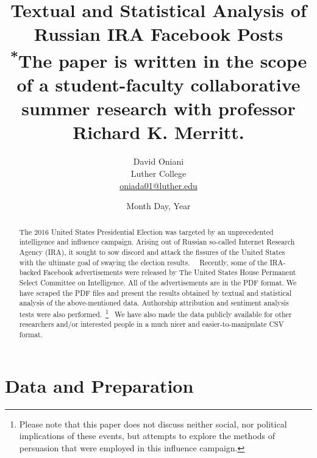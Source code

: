 \documentclass[12pt]{article}
\author{David Oniani\\
        Luther College\\
        \href{mailto:oniada01@luther.edu}{oniada01@luther.edu}}
\title{\textbf{Textual and Statistical Analysis of Russian IRA Facebook Posts}\\
      \small \textsuperscript{*}The paper is written in the scope of a student-faculty collaborative\\
                                summer research with professor Richard K. Merritt.}
\date{Month Day, Year}
\theoremstyle{definition}
\begin{document}
\maketitle


\begin{abstract}

\noindent The 2016 United States Presidential Election was targeted by an
unprecedented intelligence and influence campaign. Arising out of Russian
so-called Internet Research Agency (IRA), it sought to sow discord and attack
the fissures of the United States with the ultimate goal of swaying the
election results.~\cite{ira2016}~\cite{ira2016data} Recently, some of the
IRA-backed Facebook advertisements were released by The United States House
Permanent Select Committee on Intelligence. All of the advertisements are in
the PDF format. We have scraped the PDF files and present the results obtained
by textual and statistical analysis of the above-mentioned data. Authorship
attribution and sentiment analysis tests were also performed.~\footnote{Please
note that this paper does not discuss neither social, nor political implications
of these events, but attempts to explore the methods of persuasion that were
employed in this influence campaign.}~\cite{ira2016csvdata} We have also made
the data publicly available for other researchers and/or interested people in
a much nicer and easier-to-manipulate CSV format.
\end{abstract}


\newpage
\tableofcontents
\newpage


\section*{\centering Data and Preparation}
\end{document}

